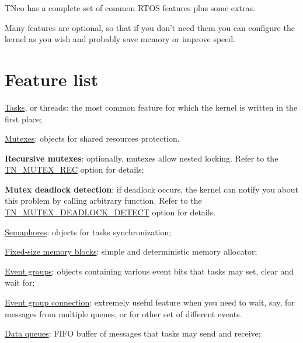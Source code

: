 T\+Neo has a complete set of common R\+T\+O\+S features plus some extras.

Many features are optional, so that if you don't need them you can configure the kernel as you wish and probably save memory or improve speed.\hypertarget{features_feature_list}{}\section{Feature list}\label{features_feature_list}

\begin{DoxyItemize}
\item \hyperlink{tn__tasks_8h}{Tasks}, or threads\+: the most common feature for which the kernel is written in the first place;
\item \hyperlink{tn__mutex_8h}{Mutexes}\+: objects for shared resources protection.
\begin{DoxyItemize}
\item {\bfseries Recursive mutexes}\+: optionally, mutexes allow nested locking. Refer to the {\ttfamily \hyperlink{tn__cfg__default_8h_a2557da78508c4241aceee92475df3581}{T\+N\+\_\+\+M\+U\+T\+E\+X\+\_\+\+R\+E\+C}} option for details;
\item {\bfseries Mutex deadlock detection}\+: if deadlock occurs, the kernel can notify you about this problem by calling arbitrary function. Refer to the {\ttfamily \hyperlink{tn__cfg__default_8h_a6ed3ec7b0d4338e7f60dde86b7ea5fa4}{T\+N\+\_\+\+M\+U\+T\+E\+X\+\_\+\+D\+E\+A\+D\+L\+O\+C\+K\+\_\+\+D\+E\+T\+E\+C\+T}} option for details.
\end{DoxyItemize}
\item \hyperlink{tn__sem_8h}{Semaphores}\+: objects for tasks synchronization;
\item \hyperlink{tn__fmem_8h}{Fixed-\/size memory blocks}\+: simple and deterministic memory allocator;
\item \hyperlink{tn__eventgrp_8h}{Event groups}\+: objects containing various event bits that tasks may set, clear and wait for;
\begin{DoxyItemize}
\item \hyperlink{tn__eventgrp_8h_eventgrp_connect}{Event group connection}\+: extremely useful feature when you need to wait, say, for messages from multiple queues, or for other set of different events.
\end{DoxyItemize}
\item \hyperlink{tn__dqueue_8h}{Data queues}\+: F\+I\+F\+O buffer of messages that tasks may send and receive;

\end{DoxyItemize}

